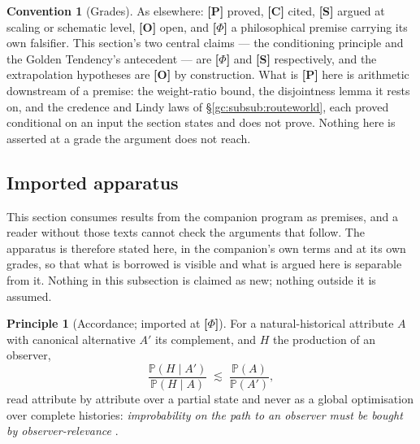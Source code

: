 \documentclass[11pt]{article}
\numberwithin{equation}{section}
\theoremstyle{plain}
\theoremstyle{definition}
\newtheorem{convention}[theorem]{Convention}
\newtheorem{principle}{Principle}
\theoremstyle{remark}
\newcommand{\PP}{\mathbb{P}}
\begin{document}
\begin{convention}[Grades]\label{gc:conv:grades}
As elsewhere: \textbf{[P]} proved, \textbf{[C]} cited, \textbf{[S]}
argued at scaling or schematic level, \textbf{[O]} open, and
\textbf{[$\Phi$]} a philosophical premise carrying its own falsifier.
This section's two central claims --- the conditioning principle and the
Golden Tendency's antecedent --- are \textbf{[$\Phi$]} and \textbf{[S]}
respectively, and the extrapolation hypotheses are \textbf{[O]} by
construction. What is \textbf{[P]} here is arithmetic downstream of a
premise: the weight-ratio bound, the disjointness lemma it rests on, and
the credence and Lindy laws of \S\ref{gc:subsub:routeworld}, each proved
conditional on an input the section states and does not prove. Nothing
here is asserted at a grade the argument does not reach.
\end{convention}

\subsection{Imported apparatus}\label{gc:sub:imported}

This section consumes results from the companion program as premises,
and a reader without those texts cannot check the arguments that follow.
The apparatus is therefore stated here, in the companion's own terms and
at its own grades, so that what is borrowed is visible and what is
argued here is separable from it. Nothing in this subsection is claimed
as new; nothing outside it is assumed.

\begin{principle}[Accordance; imported at \textbf{[$\Phi$]}]
\label{gc:prin:accordance}
For a natural-historical attribute $A$ with canonical alternative $A'$
its complement, and $H$ the production of an observer,
\begin{equation}\label{gc:eq:accordance}
\frac{\PP(H\mid A')}{\PP(H\mid A)}\;\lesssim\;\frac{\PP(A)}{\PP(A')},
\end{equation}
read attribute by attribute over a partial state and never as a global
optimisation over complete histories: \emph{improbability on the path to
an observer must be bought by observer-relevance}
\cite{Nexus, NexicFoundation}.
\end{principle}
\end{document}

